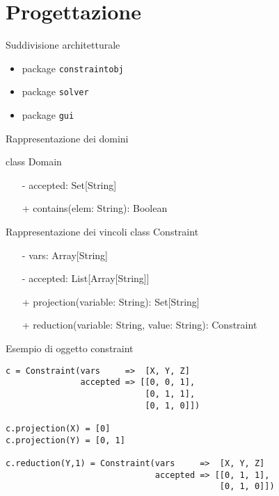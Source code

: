 \section{Progettazione}
\begin{frame}{Suddivisione architetturale}
\begin{itemize}
  \item package \texttt{constraintobj}
  \item package \texttt{solver}
  \item package \texttt{gui}
\end{itemize}
\end{frame}

\begin{frame}{Rappresentazione dei domini}


class Domain
\begin{itemize}
  \item[-] accepted: Set[String]
  \item[+] contains(elem: String): Boolean
\end{itemize}
\end{frame}

\begin{frame}{Rappresentazione dei vincoli}
class Constraint
\begin{itemize}
  \item[-] vars: Array[String]
  \item[-] accepted: List[Array[String]]
  \item[+] projection(variable: String): Set[String]
  \item[+] reduction(variable: String, value: String): Constraint
\end{itemize}
\end{frame}

\begin{frame}[fragile]{Esempio di oggetto constraint}
\begin{verbatim}
c = Constraint(vars     =>  [X, Y, Z]
               accepted => [[0, 0, 1],
                            [0, 1, 1],
                            [0, 1, 0]])
                            
c.projection(X) = [0]
c.projection(Y) = [0, 1]

c.reduction(Y,1) = Constraint(vars     =>  [X, Y, Z]
                              accepted => [[0, 1, 1],
                                           [0, 1, 0]])
\end{verbatim}  
\end{frame}

